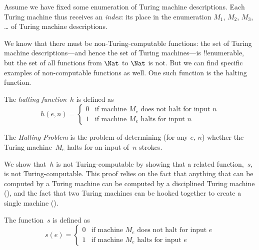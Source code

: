 \documentclass[../../../include/open-logic-section]{subfiles}
\begin{document}

\begin{explain}
Assume we have fixed some enumeration of Turing machine
descriptions.  Each Turing machine thus receives an \emph{index}: its
place in the enumeration $M_1$, $M_2$, $M_3$, \dots{} of Turing machine
descriptions.

We know that there must be non-Turing-computable functions: the set of
Turing machine descriptions---and hence the set of Turing machines---is
!!{enumerable}, but the set of all functions from $\Nat$ to $\Nat$ is
not. But we can find specific examples of non-computable functions as
well. One such function is the halting function.
\end{explain}

\begin{defn}
 The \emph{halting function}~$h$ is defined as
\[
h(e,n) =
\begin{cases}
  \text{0} & \text{if machine~$M_e$ does not halt for input $n$} \\
  \text{1} & \text{if machine~$M_e$ halts for input $n$}
\end{cases}
\]
\end{defn}

\begin{defn}
The \emph{Halting Problem} is the problem of determining (for any $e$, $n$)
whether the Turing machine~$M_e$ halts for an input of~$n$ strokes.
\end{defn}

\begin{explain}
We show that~$h$ is not Turing-computable by showing that a related
function,~$s$, is not Turing-computable. This proof relies on the fact
that anything that can be computed by a Turing machine can be computed
by a disciplined Turing machine (), and the fact
that two Turing machines can be hooked together to create a single
machine ().
\end{explain}

\begin{defn} The function~$s$ is defined as
\[
s(e) =
\begin{cases}
  \text{0} & \text{if machine~$M_e$ does not halt for input $e$} \\
  \text{1} & \text{if machine~$M_e$ halts for input $e$}
\end{cases}
\]
\end{defn}
\end{document}
